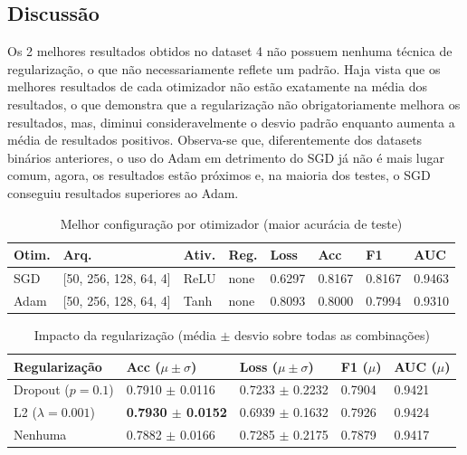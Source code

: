 \documentclass[12pt,a4paper]{article}
\begin{document}
\newpage

\subsection{Discussão}

Os 2 melhores resultados obtidos no dataset 4 não possuem nenhuma técnica de regularização, o que não necessariamente reflete um padrão. Haja vista que os melhores resultados de cada otimizador não estão exatamente na média dos resultados, o que demonstra que a regularização não obrigatoriamente melhora os resultados, mas, diminui consideravelmente o desvio padrão enquanto aumenta a média de resultados positivos. Observa-se que, diferentemente dos datasets binários anteriores, o uso do Adam em detrimento do SGD já não é mais lugar comum, agora, os resultados estão próximos e, na maioria dos testes, o SGD conseguiu resultados superiores ao Adam.

\begin{table}[h]
\centering
\caption{Melhor configuração por otimizador (maior acurácia de teste)}
\label{tab:best_per_optimizer}
\begin{tabular}{llllllll}
\toprule
\textbf{Otim.} & \textbf{Arq.} & \textbf{Ativ.} & \textbf{Reg.} &
\textbf{Loss} & \textbf{Acc} & \textbf{F1} & \textbf{AUC} \\
\midrule
SGD & [50, 256, 128, 64, 4] & ReLU & none & 0.6297 & 0.8167 & 0.8167 & 0.9463 \\
Adam & [50, 256, 128, 64, 4] & Tanh & none & 0.8093 & 0.8000 & 0.7994 & 0.9310 \\
\bottomrule
\end{tabular}
\end{table}


\begin{table}[h]
\centering
\caption{Impacto da regularização (média $\pm$ desvio sobre todas as combinações)}
\label{tab:regularization}
\begin{tabular}{lllll}
\toprule
\textbf{Regularização} & \textbf{Acc ($\mu \pm \sigma$)} & \textbf{Loss ($\mu \pm \sigma$)} &
\textbf{F1 ($\mu$)} & \textbf{AUC ($\mu$)} \\
\midrule
Dropout ($p=0.1$) & 0.7910 $\pm$ 0.0116 & 0.7233 $\pm$ 0.2232 & 0.7904 & 0.9421 \\
L2 ($\lambda=0.001$) & \textbf{0.7930 $\pm$ 0.0152} & 0.6939 $\pm$ 0.1632 & 0.7926 & 0.9424 \\
Nenhuma & 0.7882 $\pm$ 0.0166 & 0.7285 $\pm$ 0.2175 & 0.7879 & 0.9417 \\
\bottomrule
\end{tabular}
\end{table}
\end{document}

